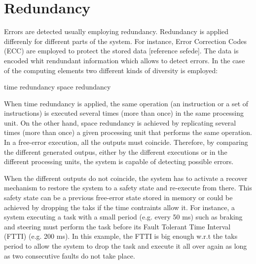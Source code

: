 \section{Redundancy} 

Errors are detected usually employing redundancy. Redundancy is applied differenly for different parts of the system. For instance, Error Correction Codes (ECC) are employed to protect the stored data [reference sefede]. The data is encoded whit rendundant information which allows to detect errors. In the case of the computing elements two different kinds of diversity is employed:

time redundancy
space redundancy

When time redundancy is applied, the same operation (an instruction or a set of instructions) is executed several times (more than once) in the same processing unit. On the other hand, space redundancy is achieved by replicating several times (more than once) a given processing unit that performs the same operation. In a free-error execution, all the outputs must coincide. Therefore, by comparing the different generated outpus, either by the different executions or in the different processing units, the system is capable of detecting possible errors. 

When the different outputs do not coincide, the system has to activate a recover mechanism to restore the system to a safety state and re-execute from there. This safety state can be a previous free-error state stored in memory or could be achieved by dropping the taks if the time contraints allow it. For instance, a system executing a task with a small period (e.g. every 50 ms) such as braking and steering must perform the task before its Fault Tolerant Time Interval (FTTI) (e.g. 200 ms). In this example, the FTTI is big enough w.r.t the taks period to allow the system to drop the task and execute it all over again as long as two consecutive faults do not take place.

